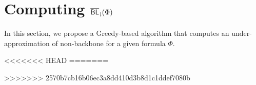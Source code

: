 \section{Computing ${\sf \overline{BL}_\downharpoonright}(\Phi)$}
In this section, we propose a Greedy-based algorithm that computes an under-approximation of non-backbone for a given formula
$\Phi$.  

<<<<<<< HEAD
=======

>>>>>>> 2570b7cb16b06ec3a8dd410d3b8d1c1ddef7080b


\medskip

